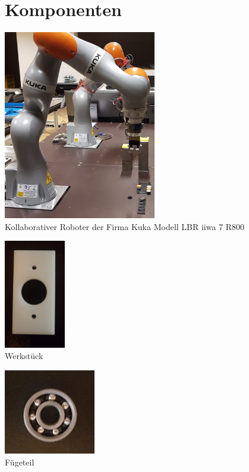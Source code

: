 \documentclass[12pt]{article}
\begin{document}
\section{Komponenten}

\begin{center}
\includegraphics[width=0.5\textwidth]{img/Kuka}\\
Kollaborativer Roboter der Firma Kuka Modell LBR iiwa 7 R800\\
\end{center}


\begin{center}
\includegraphics[width=0.2\textwidth]{img/werkstueck}\\
Werkstück 
\end{center}

\begin{center}
\includegraphics[width=0.3\textwidth]{img/Kugellager}\\
Fügeteil\\
\end{center}
\end{document}
